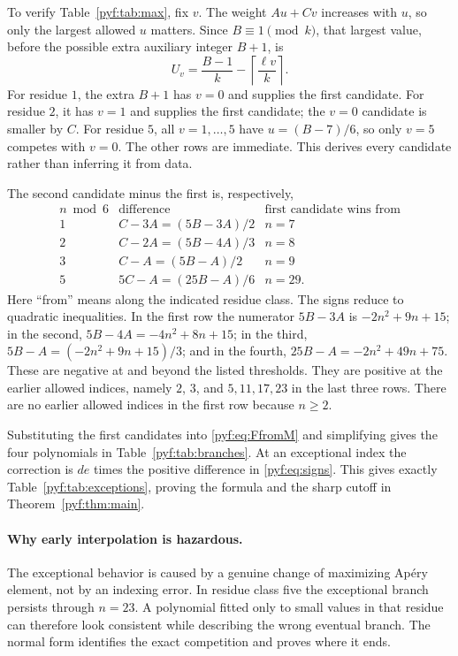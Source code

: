 \documentclass[11pt,a4paper]{article}
\numberwithin{equation}{section}
\theoremstyle{definition}
\newcommand{\ceil}[1]{\left\lceil#1\right\rceil}
\begin{document}
To verify Table~\ref{pyf:tab:max}, fix $v$. The weight $Au+Cv$ increases with
$u$, so only the largest allowed $u$ matters. Since $B\equiv1\pmod k$,
that largest value, before the possible extra auxiliary integer $B+1$, is
\begin{equation}\label{pyf:eq:U}
U_v=\frac{B-1}{k}-\ceil{\frac{\ell v}{k}}.
\end{equation}
For residue $1$, the extra $B+1$ has $v=0$ and supplies the first candidate.
For residue $2$, it has $v=1$ and supplies the first candidate; the $v=0$
candidate is smaller by $C$. For residue $5$, all $v=1,\ldots,5$ have
$u=(B-7)/6$, so only $v=5$ competes with $v=0$. The other rows are
immediate. This derives every candidate rather than inferring it from data.

The second candidate minus the first is, respectively,
\begin{equation}\label{pyf:eq:signs}
\begin{array}{c|c|c}
n\bmod6 & \text{difference} & \text{first candidate wins from}\\ \hline
1 & C-3A=(5B-3A)/2 & n=7\\
2 & C-2A=(5B-4A)/3 & n=8\\
3 & C-A=(5B-A)/2 & n=9\\
5 & 5C-A=(25B-A)/6 & n=29.
\end{array}
\end{equation}
Here ``from'' means along the indicated residue class. The signs reduce to
quadratic inequalities. In the first row the numerator $5B-3A$ is
$-2n^2+9n+15$; in the second, $5B-4A=-4n^2+8n+15$; in the third,
$5B-A=(-2n^2+9n+15)/3$; and in the fourth,
$25B-A=-2n^2+49n+75$. These are negative at and beyond the listed
thresholds. They are positive at the earlier allowed indices, namely
$2$, $3$, and $5,11,17,23$ in the last three rows. There are no earlier
allowed indices in the first row because $n\geq2$.

Substituting the first candidates into \eqref{pyf:eq:FfromM} and simplifying
gives the four polynomials in Table~\ref{pyf:tab:branches}. At an exceptional
index the correction is $de$ times the positive difference in
\eqref{pyf:eq:signs}. This gives exactly Table~\ref{pyf:tab:exceptions}, proving
the formula and the sharp cutoff in Theorem~\ref{pyf:thm:main}.

\paragraph{Why early interpolation is hazardous.}
The exceptional behavior is caused by a genuine change of maximizing
Ap\'ery element, not by an indexing error. In residue class five the
exceptional branch persists through $n=23$. A polynomial fitted only to
small values in that residue can therefore look consistent while describing
the wrong eventual branch. The normal form identifies the exact competition
and proves where it ends.
\end{document}
